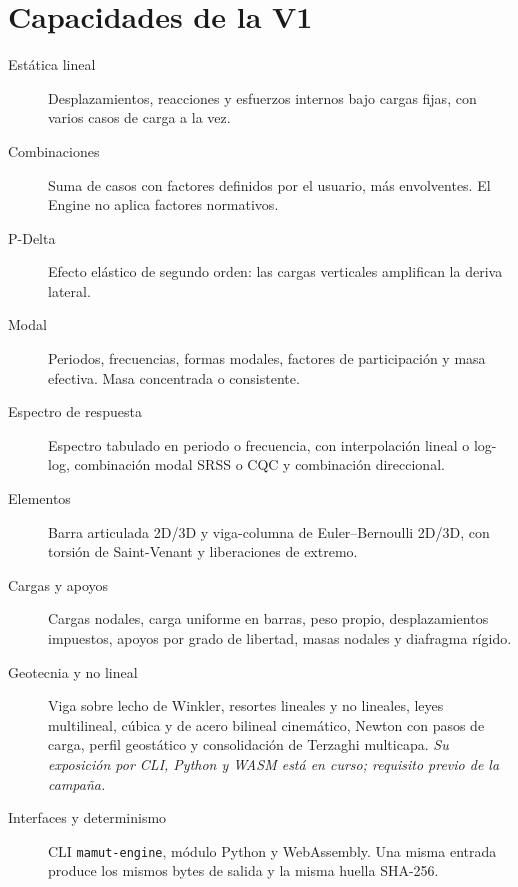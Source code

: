 \chapter{Capacidades de la V1}
\begin{description}
\item[Estática lineal] Desplazamientos, reacciones y esfuerzos internos bajo cargas fijas, con varios casos de carga a la vez.
\item[Combinaciones] Suma de casos con factores definidos por el usuario, más envolventes. El Engine no aplica factores normativos.
\item[P-Delta] Efecto elástico de segundo orden: las cargas verticales amplifican la deriva lateral.
\item[Modal] Periodos, frecuencias, formas modales, factores de participación y masa efectiva. Masa concentrada o consistente.
\item[Espectro de respuesta] Espectro tabulado en periodo o frecuencia, con interpolación lineal o log-log, combinación modal SRSS o CQC y combinación direccional.
\item[Elementos] Barra articulada 2D/3D y viga-columna de Euler--Bernoulli 2D/3D, con torsión de Saint-Venant y liberaciones de extremo.
\item[Cargas y apoyos] Cargas nodales, carga uniforme en barras, peso propio, desplazamientos impuestos, apoyos por grado de libertad, masas nodales y diafragma rígido.
\item[Geotecnia y no lineal] Viga sobre lecho de Winkler, resortes lineales y no lineales, leyes multilineal, cúbica y de acero bilineal cinemático, Newton con pasos de carga, perfil geostático y consolidación de Terzaghi multicapa. \emph{Su exposición por CLI, Python y WASM está en curso; requisito previo de la campaña.}
\item[Interfaces y determinismo] CLI \texttt{mamut-engine}, módulo Python y WebAssembly. Una misma entrada produce los mismos bytes de salida y la misma huella SHA-256.
\end{description}
